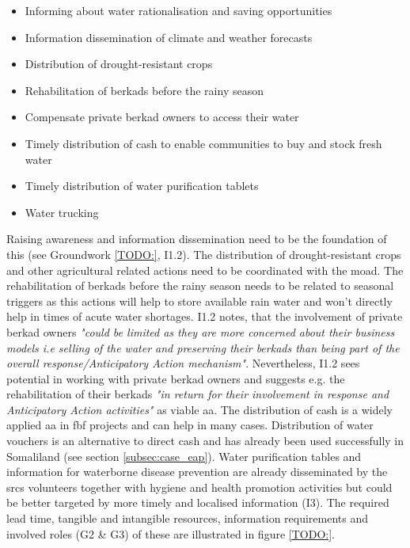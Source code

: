 \begin{itemize}
    \item Informing about water rationalisation and saving opportunities
    \item Information dissemination of climate and weather forecasts
    \item Distribution of drought-resistant crops
    \item Rehabilitation of berkads before the rainy season 
    \item Compensate private berkad owners to access their water
    \item Timely distribution of cash to enable communities to buy and stock fresh water
    \item Timely distribution of water purification tablets 
    \item Water trucking
\end{itemize}

Raising awareness and information dissemination need to be the foundation of this (see Groundwork \ref*{TODO:}, I1.2). The distribution of drought-resistant crops and other agricultural related actions need to be coordinated with the \acrfull{moad}. The rehabilitation of berkads before the rainy season needs to be related to seasonal triggers as this actions will help to store available rain water and won't directly help in times of acute water shortages. I1.2 notes, that the involvement of private berkad owners \textit{"could be limited as they are more concerned about their business models i.e selling of the water and preserving their berkads than being part of the overall response/Anticipatory Action mechanism"}. Nevertheless, I1.2 sees potential in working with private berkad owners and suggests e.g. the rehabilitation of their berkads \textit{"in return for their involvement in response and Anticipatory Action activities"} as viable \acrshort{aa}. The distribution of cash is a widely applied \acrshort{aa} in \acrshort{fbf} projects and can help in many cases. Distribution of water vouchers is an alternative to direct cash and has already been used successfully in Somaliland (see section \ref*{subsec:case_eap}). Water purification tables and information for waterborne disease prevention are already disseminated by the \acrshort{srcs} volunteers together with hygiene and health promotion activities but could be better targeted by more timely and localised information (I3). The required lead time, tangible and intangible resources, information requirements and involved roles (G2 \& G3) of these  are illustrated in figure \ref*{TODO:}. 

